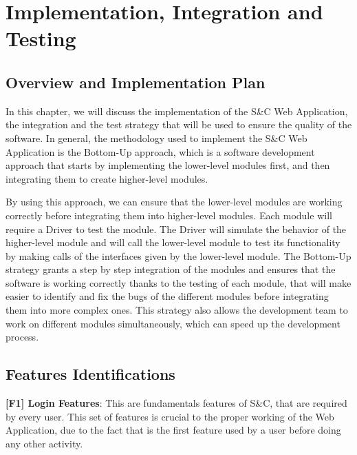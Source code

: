 \chapter{Implementation, Integration and Testing}
\label{ch:implementation-integration-and-testing}%

\section{Overview and Implementation Plan}
\label{sec:overview-and-implementation-plan}

\par In this chapter, we will discuss the implementation of the S\&C Web Application, the integration and the test
strategy that will be used to ensure the quality of the software. In general, the methodology used to implement the
S\&C Web Application is the Bottom-Up approach, which is a software development approach that starts by implementing
the lower-level modules first, and then integrating them to create higher-level modules.

\par By using this approach, we can ensure that the lower-level modules are working correctly before integrating them into
higher-level modules. Each module will require a Driver to test the module. The Driver will simulate the behavior of
the higher-level module and will call the lower-level module to test its functionality by making calls of the interfaces
given by the lower-level module.
The Bottom-Up strategy grants a step by step integration of the modules and ensures that the software is working correctly
thanks to the testing of each module, that will make easier to identify and fix the bugs of the different modules before
integrating them into more complex ones. This strategy also allows the development team to work on different modules
simultaneously, which can speed up the development process.


\section{Features Identifications}
\label{sec:features-identifications}%

\par \textbf{[F1] Login Features}: This are fundamentals features of S\&C, that are required by every user. 
This set of features is crucial to the proper working of the Web Application, due to the fact that is the first feature 
used by a user before doing any other activity.

